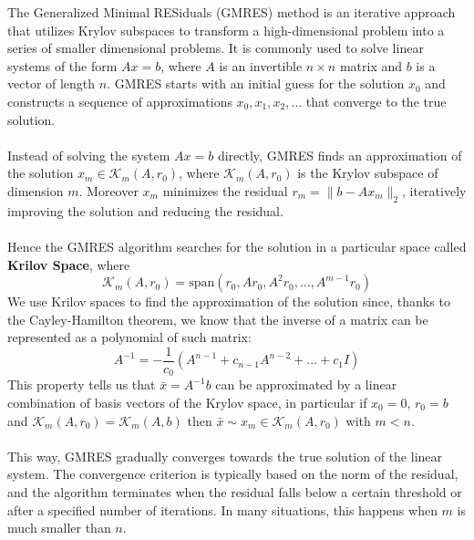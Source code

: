 The Generalized Minimal RESiduals (GMRES) method is an iterative approach that utilizes Krylov subspaces to transform a high-dimensional problem into a series of smaller dimensional problems.  It is commonly used to solve linear systems of the form $Ax = b$, where $A$ is an invertible $n \times n$ matrix and $b$ is a vector of length $n$.
GMRES starts with an initial guess for the solution $x_0$ and constructs a sequence of approximations $x_0, x_1, x_2, \ldots$ that converge to the true solution. \\
\\
Instead of solving the system $Ax = b$ directly, GMRES  finds an approximation of the solution $x_m \in \mathcal{K}_m(A,r_0)$, where $\mathcal{K}_m(A, r_0)$ is the Krylov subspace of dimension $m$. Moreover $x_m$ minimizes the residual $r_m = \|b - Ax_m\|_2$, iteratively improving the solution and reducing the residual.\\
\\
Hence the GMRES algorithm searches for the solution in a particular space called \textbf{Krilov Space}, where
\begin{equation*}
    \mathcal{K}_m(A, r_0) = \text{span}(r_0, Ar_0, A^2 r_0, ... , A^{m-1}r_0) 
\end{equation*}
We use Krilov spaces to find the approximation of the solution since, thanks to the Cayley-Hamilton theorem, we know that the inverse of a matrix can be represented as a polynomial of such matrix:
\begin{equation*}
    A^{-1} = - \frac{1}{c_0} (A^{n-1} + c_{n-1}A^{n-2}+ ... + c_1I)
\end{equation*}
This property tells us that \(\bar{x} = A^{-1}b\) can be approximated by a linear combination of basis vectors of the Krylov space, in particular if \(x_0 = 0\), \(r_0 = b\) and \(\mathcal{K}_m(A, r_0) = \mathcal{K}_m(A, b)\) then \(\bar{x} \sim x_m \in \mathcal{K}_m(A, r_0)\) with \(m < n\). \\
\\
This way, GMRES gradually converges towards the true solution of the linear system. The convergence criterion is typically based on the norm of the residual, and the algorithm terminates when the residual falls below a certain threshold or after a specified number of iterations. In many situations, this happens when $m$ is much smaller than $n$.

